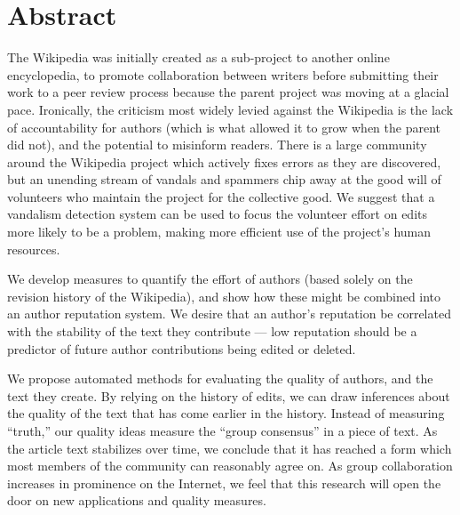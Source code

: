 \chapter{Abstract}
\begin{comment}
WikiTrust: Measuring Group Collaboration
by
B. Thomas Adler
\end{comment}

The Wikipedia was initially created as a sub-project to another
online encyclopedia, to promote collaboration between writers
before submitting their work to a peer review process because
the parent project was moving at a glacial pace.
Ironically, the criticism most widely levied against the Wikipedia
is the lack of accountability
for authors (which is what allowed it to grow when the parent did not),
and the potential to misinform readers.
There is a large community around the Wikipedia project which actively
fixes errors as they are discovered, but an unending
stream of vandals and spammers chip
away at the good will of volunteers who
maintain the project for the collective good.
We suggest that a vandalism detection system
can be used to focus
the volunteer effort on edits more likely to be a problem,
making more efficient use of the project's human resources.

We develop measures to quantify the effort of authors
(based solely on the revision history of the Wikipedia),
and show how these might be combined into an author
reputation system.
We desire that an author's reputation be correlated with the
stability of the text they contribute ---
low reputation should be a predictor of future author
contributions being edited or deleted.

We propose automated methods for evaluating the quality of
authors, and the text they create.
By relying on the history of edits, we can draw inferences about
the quality of the text that has come earlier in the history.
Instead of measuring ``truth,'' our quality ideas
measure the ``group consensus'' in a piece of text.
As the article text stabilizes over time, we conclude that
it has reached a form which most members of the community can
reasonably agree on.
As group collaboration increases in prominence on the Internet,
we feel that this research will open the door on new applications
and quality measures.

